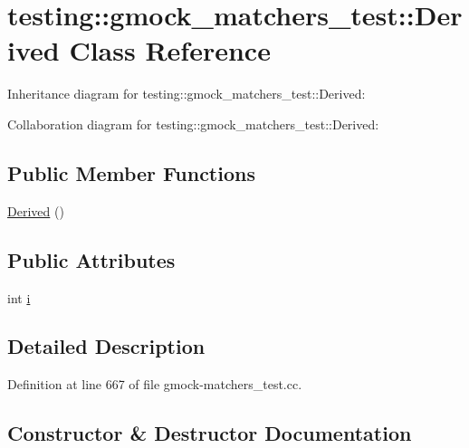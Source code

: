 \hypertarget{classtesting_1_1gmock__matchers__test_1_1_derived}{}\section{testing\+:\+:gmock\+\_\+matchers\+\_\+test\+:\+:Derived Class Reference}
\label{classtesting_1_1gmock__matchers__test_1_1_derived}


Inheritance diagram for testing\+:\+:gmock\+\_\+matchers\+\_\+test\+:\+:Derived\+:


Collaboration diagram for testing\+:\+:gmock\+\_\+matchers\+\_\+test\+:\+:Derived\+:
\subsection*{Public Member Functions}
\begin{DoxyCompactItemize}
\item 
\hyperlink{classtesting_1_1gmock__matchers__test_1_1_derived_a3de17d9e4bfb19dcafb88d3cccbbeaf2}{Derived} ()
\end{DoxyCompactItemize}
\subsection*{Public Attributes}
\begin{DoxyCompactItemize}
\item 
int \hyperlink{classtesting_1_1gmock__matchers__test_1_1_derived_a357d6747c44d7af7159fb5898a782f1b}{i}
\end{DoxyCompactItemize}


\subsection{Detailed Description}


Definition at line 667 of file gmock-\/matchers\+\_\+test.\+cc.



\subsection{Constructor \& Destructor Documentation}
